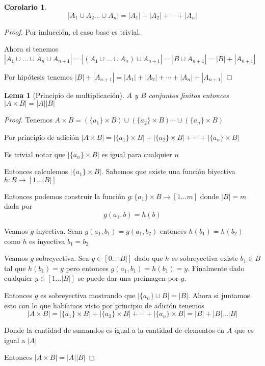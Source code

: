 \documentclass{article}
\theoremstyle{break}
\newtheorem{corollary}{Corolario}[theorem]
\newtheorem{lemma}[theorem]{Lema}
\begin{document}
    \begin{corollary}
        $$|A_1 \cup A_2 \ldots \cup A_n| = |A_1| + |A_2| + \cdots + |A_n|$$
    \end{corollary}
    \begin{proof}
        Por inducción, el caso base es trivial.

        Ahora si tenemos $|A_1 \cup \ldots \cup A_n \cup A_{n+1}| = |(A_1\cup\ldots\cup A_n) \cup A_{n+1}| = |B \cup A_{n+1}| = |B| + |A_{n+1}|$

        Por hipótesis tenemos $|B| + |A_{n+1}| = |A_1| + |A_2| + \cdots + |A_n| + |A_{n+1}|$
    \end{proof}

    \begin{lemma}[Principio de multiplicación]\label{sec:pmult}
        $A$ y $B$ conjuntos finitos entonces $|A\times B| = |A||B|$
    \end{lemma}

    \begin{proof}
        Tenemos $A\times B = (\{a_1\} \times B )\cup  (\{a_2\} \times B )\cdots \cup(\{a_n\} \times B )$ 

        Por principio de adición 
        $|A\times B| = |\{a_1\} \times B |+ |\{a_2\} \times B | + \cdots +|\{a_n\} \times B |$

        Es trivial notar que $|\{a_n\} \times B|$ es igual para cualquier $n$

        Entonces calculemos $|\{a_1\} \times B|$. Sabemos que existe una función biyectiva $h: B\rightarrow [1\ldots|B|]$

        Entonces podemos construir la función $g: \{a_1\}\times B \rightarrow [1\ldots m]$ donde $|B| = m$
        dada por $$ g(a_1,b) = h(b)$$

        Veamos $g$ inyectiva. Sean $g(a_1,b_1) = g(a_1,b_2)$ entonces $h(b_1) = h(b_2)$ como $h$ es inyectiva
        $b_1=b_2$

        Veamos $g$ sobreyectiva. Sea $y\in[0\ldots |B|]$ dado que $h$ es sobreyectiva existe $b_1 \in B$ 
        tal que $h(b_1) = y$ pero entonces $g(a_1,b_1) = h(b_1) = y$. Finalmente dado cualquier $y \in [1\ldots |B|]$
        se puede dar una preimagen por $g$. 

        Entonces $g$ es sobreyectiva mostrando que $|\{a_n\} \cup B | = |B|$. Ahora si juntamos esto con lo que
        habíamos visto por principio de adición tenemos
        $$|A\times B| = |\{a_1\} \times B |+ |\{a_2\} \times B | + \cdots +|\{a_n\} \times B | = |B| + |B| \ldots |B|$$ 

        Donde la cantidad de sumandos es igual a la cantidad de elementos en $A$ que es igual a $|A|$

        Entonces $|A\times B|= |A||B|$


    \end{proof}
\end{document}
